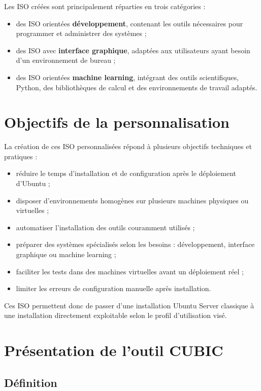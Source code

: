 \documentclass[12pt,a4paper]{article}
\begin{document}
Les ISO créées sont principalement réparties en trois catégories :
\begin{itemize}[label=--]
    \item des ISO orientées \textbf{développement}, contenant les outils nécessaires pour programmer et administrer des systèmes ;
    \item des ISO avec \textbf{interface graphique}, adaptées aux utilisateurs ayant besoin d'un environnement de bureau ;
    \item des ISO orientées \textbf{machine learning}, intégrant des outils scientifiques, Python, des bibliothèques de calcul et des environnements de travail adaptés.
\end{itemize}

\section{Objectifs de la personnalisation}

La création de ces ISO personnalisées répond à plusieurs objectifs techniques et pratiques :

\begin{itemize}[label=--]
    \item réduire le temps d'installation et de configuration après le déploiement d'Ubuntu ;
    \item disposer d'environnements homogènes sur plusieurs machines physiques ou virtuelles ;
    \item automatiser l'installation des outils couramment utilisés ;
    \item préparer des systèmes spécialisés selon les besoins : développement, interface graphique ou machine learning ;
    \item faciliter les tests dans des machines virtuelles avant un déploiement réel ;
    \item limiter les erreurs de configuration manuelle après installation.
\end{itemize}

Ces ISO permettent donc de passer d'une installation Ubuntu Server classique à une installation directement exploitable selon le profil d'utilisation visé.

\section{Présentation de l'outil CUBIC}

\subsection{Définition}
\end{document}
